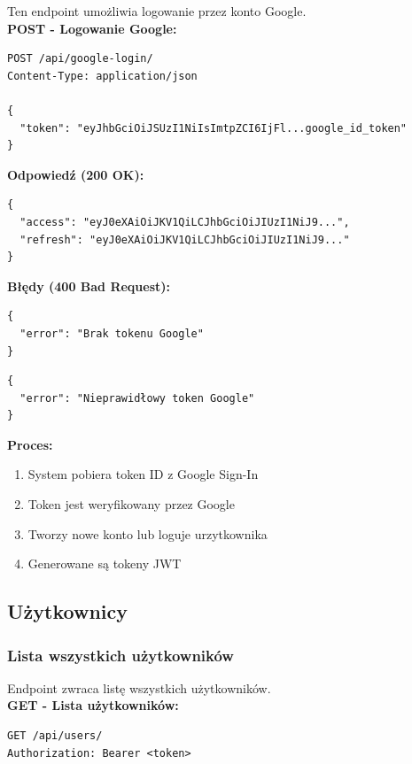 \documentclass[a4paper,12pt]{article}
\begin{document}
Ten endpoint umożliwia logowanie przez konto Google.\\

\textbf{POST - Logowanie Google:}
\begin{lstlisting}
POST /api/google-login/
Content-Type: application/json

{
  "token": "eyJhbGciOiJSUzI1NiIsImtpZCI6IjFl...google_id_token"
}
\end{lstlisting}

\vspace{0.5cm}

\textbf{Odpowiedź (200 OK):}
\begin{lstlisting}
{
  "access": "eyJ0eXAiOiJKV1QiLCJhbGciOiJIUzI1NiJ9...",
  "refresh": "eyJ0eXAiOiJKV1QiLCJhbGciOiJIUzI1NiJ9..."
}
\end{lstlisting}

\vspace{0.5cm}

\textbf{Błędy (400 Bad Request):}
\begin{lstlisting}
{
  "error": "Brak tokenu Google"
}
\end{lstlisting}

\begin{lstlisting}
{
  "error": "Nieprawidłowy token Google"
}
\end{lstlisting}

\textbf{Proces:}
\begin{enumerate}[label=\arabic*.]
    \item System pobiera token ID z Google Sign-In
    \item Token jest weryfikowany przez Google
    \item Tworzy nowe konto lub loguje urzytkownika
    \item Generowane są tokeny JWT
\end{enumerate}

\newpage

\subsection{Użytkownicy}

\subsubsection{Lista wszystkich użytkowników}

Endpoint zwraca listę wszystkich użytkowników. \\

\textbf{GET - Lista użytkowników:}
\begin{lstlisting}
GET /api/users/
Authorization: Bearer <token>
\end{lstlisting}
\end{document}
